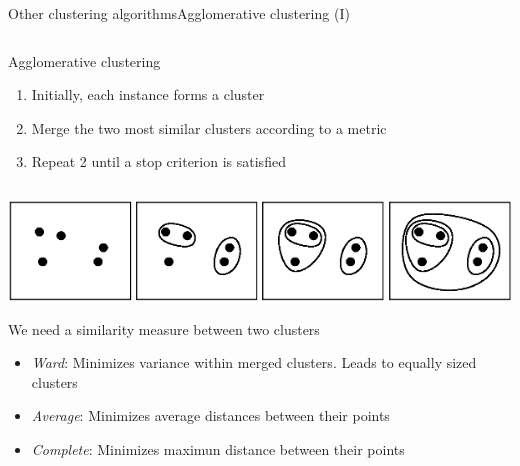 \documentclass[10pt,compress]{beamer} %
\begin{document}
\begin{frame}{Other clustering algorithms}{Agglomerative clustering (I)}

    \begin{columns}
            \begin{block}{Agglomerative clustering}
            \begin{enumerate}
                \item Initially, each instance forms a cluster
                \item Merge the two most similar clusters according to a metric
                \item Repeat 2 until a stop criterion is satisfied
            \end{enumerate}
            \end{block}
    \end{columns}

    \medskip
    \begin{center}
	\includegraphics[width=0.7\linewidth]{figs/agglomerative.png}\\
    \end{center}
    \medskip

    We need a similarity measure between two clusters
    \begin{itemize}
        \item \textit{Ward}: Minimizes variance within merged clusters. Leads to equally sized clusters
        \item \textit{Average}: Minimizes average distances between their points
        \item \textit{Complete}: Minimizes maximun distance between their points
    \end{itemize}
\end{frame}
\end{document}
